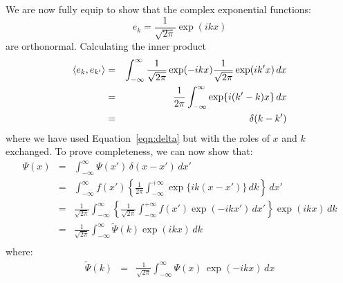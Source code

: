 \documentclass[12pt]{article}
\begin{document}
We are now fully equip to show that the complex exponential functions:
\begin{equation*}
e_k = \frac{1}{\sqrt{2\pi}} \exp(i k x)
\end{equation*}
are orthonormal.  Calculating the inner product
\begin{eqnarray*}
\braket{e_k, e_{k'}} &=& \int_{-\infty}^{\infty} \frac{1}{\sqrt{2 \pi}}  \exp(-ikx) \frac{1}{\sqrt{2 \pi}}  \exp(ik'x) \, dx \\
                               &=& \frac{1}{2 \pi} \int_{-\infty}^{\infty} \exp\{i(k'-k)x\} \, dx \\
                               &=& \delta(k-k')
\end{eqnarray*}
where we have used Equation~\ref{eqn:delta} but with the roles of $x$ and $k$ exchanged.
To prove completeness, we can now show that:
\begin{eqnarray*}
\Psi(x) &=& \int_{-\infty}^{\infty} \Psi(x') \, \delta(x-x') \, dx' \\
&=& \int_{-\infty}^{\infty} f(x') \left\{ \frac{1}{2 \pi} \int_{-\infty}^{+\infty} \exp\{ik(x-x')\} \, dk \right\} \, dx' \\
&=& \frac{1}{\sqrt{2 \pi}} \int_{-\infty}^{\infty} \left\{ \frac{1}{\sqrt{2 \pi}} \int_{-\infty}^{+\infty} f(x') \exp(-ikx') \, dx' \right\}  \exp(ikx) \, dk \\
&=& \frac{1}{\sqrt{2 \pi}} \int_{-\infty}^{\infty} \widetilde{\Psi}(k)  \exp(ikx) \, dk \\
\end{eqnarray*}
where:
\begin{eqnarray*}
\widetilde{\Psi}(k) &=& \frac{1}{\sqrt{2\pi}} \int_{-\infty}^{\infty} \Psi(x) \, \exp(-ikx) \, dx \\
\end{eqnarray*}
\end{document}
